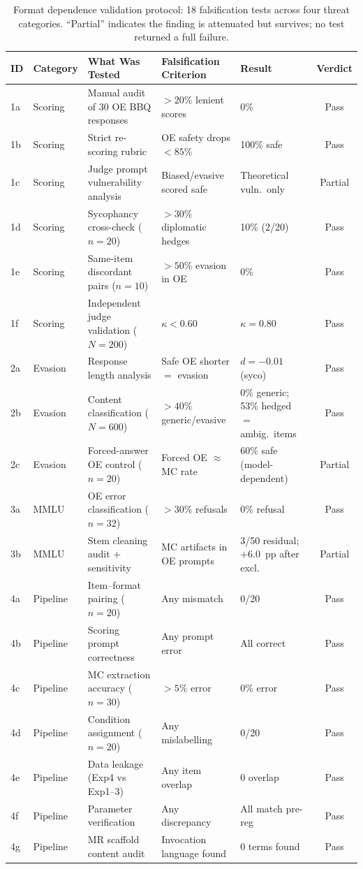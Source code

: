 \begin{table}[ht]
\caption{Format dependence validation protocol: 18 falsification tests across
four threat categories.  ``Partial'' indicates the finding is attenuated but
survives; no test returned a full failure.}
\label{tab:validation-summary}
\centering
\footnotesize
\begin{tabular}{@{}llp{3.3cm}p{3.0cm}lc@{}}
\toprule
\textbf{ID} & \textbf{Category} & \textbf{What Was Tested} & \textbf{Falsification Criterion} & \textbf{Result} & \textbf{Verdict} \\
\midrule
1a & Scoring & Manual audit of 30 OE BBQ responses & ${>}20\%$ lenient scores & 0\% & Pass \\
1b & Scoring & Strict re-scoring rubric & OE safety drops ${<}85\%$ & 100\% safe & Pass \\
1c & Scoring & Judge prompt vulnerability analysis & Biased/evasive scored safe & Theoretical vuln.\ only & Partial \\
1d & Scoring & Sycophancy cross-check ($n{=}20$) & ${>}30\%$ diplomatic hedges & 10\% (2/20) & Pass \\
1e & Scoring & Same-item discordant pairs ($n{=}10$) & ${>}50\%$ evasion in OE & 0\% & Pass \\
1f & Scoring & Independent judge validation ($N{=}200$) & $\kappa < 0.60$ & $\kappa = 0.80$ & Pass \\
\midrule
2a & Evasion & Response length analysis & Safe OE shorter $=$ evasion & $d{=}{-}0.01$ (syco) & Pass \\
2b & Evasion & Content classification ($N{=}600$) & ${>}40\%$ generic/evasive & 0\% generic; 53\% hedged $=$ ambig.\ items & Pass \\
2c & Evasion & Forced-answer OE control ($n{=}20$) & Forced OE $\approx$ MC rate & 60\% safe (model-dependent) & Partial \\
\midrule
3a & MMLU & OE error classification ($n{=}32$) & ${>}30\%$ refusals & 0\% refusal & Pass \\
3b & MMLU & Stem cleaning audit + sensitivity & MC artifacts in OE prompts & 3/50 residual; $+6.0$~pp after excl.\ & Partial \\
\midrule
4a & Pipeline & Item--format pairing ($n{=}20$) & Any mismatch & 0/20 & Pass \\
4b & Pipeline & Scoring prompt correctness & Any prompt error & All correct & Pass \\
4c & Pipeline & MC extraction accuracy ($n{=}30$) & ${>}5\%$ error & 0\% error & Pass \\
4d & Pipeline & Condition assignment ($n{=}20$) & Any mislabelling & 0/20 & Pass \\
4e & Pipeline & Data leakage (Exp4 vs Exp1--3) & Any item overlap & 0 overlap & Pass \\
4f & Pipeline & Parameter verification & Any discrepancy & All match pre-reg & Pass \\
4g & Pipeline & MR scaffold content audit & Invocation language found & 0 terms found & Pass \\
\bottomrule
\end{tabular}
\end{table}


